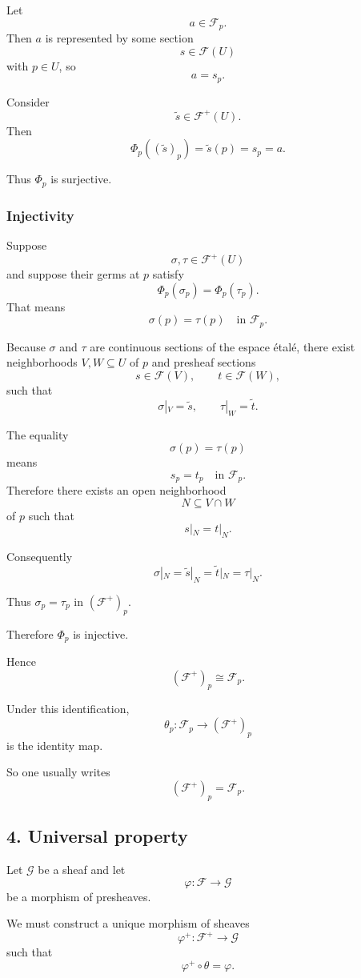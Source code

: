Let
\[
a \in \mathcal F_p.
\]
Then $a$ is represented by some section
\[
s \in \mathcal F(U)
\]
with $p \in U$, so
\[
a = s_p.
\]

Consider
\[
\widetilde{s} \in \mathcal F^+(U).
\]
Then
\[
\Phi_p((\widetilde{s})_p)
=
\widetilde{s}(p)
=
s_p
=
a.
\]

Thus $\Phi_p$ is surjective.

\subsubsection*{Injectivity}

Suppose
\[
\sigma,\tau \in \mathcal F^+(U)
\]
and suppose their germs at $p$ satisfy
\[
\Phi_p(\sigma_p) = \Phi_p(\tau_p).
\]
That means
\[
\sigma(p) = \tau(p)
\quad \text{in } \mathcal F_p.
\]

Because $\sigma$ and $\tau$ are continuous sections of the espace étalé,
there exist neighborhoods $V,W \subseteq U$ of $p$ and presheaf sections
\[
s \in \mathcal F(V),
\qquad
t \in \mathcal F(W),
\]
such that
\[
\sigma|_V = \widetilde{s},
\qquad
\tau|_W = \widetilde{t}.
\]

The equality
\[
\sigma(p)=\tau(p)
\]
means
\[
s_p = t_p
\quad \text{in } \mathcal F_p.
\]
Therefore there exists an open neighborhood
\[
N \subseteq V \cap W
\]
of $p$ such that
\[
s|_N = t|_N.
\]

Consequently
\[
\sigma|_N = \widetilde{s}|_N
=
\widetilde{t}|_N
=
\tau|_N.
\]

Thus $\sigma_p=\tau_p$ in $(\mathcal F^+)_p$.

Therefore $\Phi_p$ is injective.

Hence
\[
(\mathcal F^+)_p \cong \mathcal F_p.
\]

Under this identification,
\[
\theta_p : \mathcal F_p \longrightarrow (\mathcal F^+)_p
\]
is the identity map.

So one usually writes
\[
(\mathcal F^+)_p = \mathcal F_p.
\]

\subsection*{4. Universal property}

Let $\mathcal G$ be a sheaf and let
\[
\varphi : \mathcal F \longrightarrow \mathcal G
\]
be a morphism of presheaves.

We must construct a unique morphism of sheaves
\[
\varphi^+ : \mathcal F^+ \longrightarrow \mathcal G
\]
such that
\[
\varphi^+ \circ \theta = \varphi.
\]

